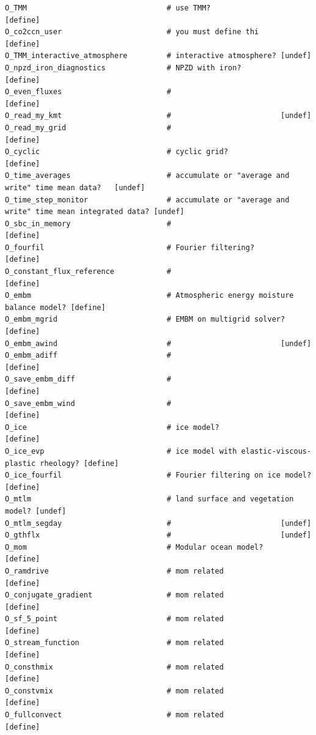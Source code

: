 \documentclass[a4paper]{article}
\begin{document}
\begin{lstlisting}[frame=single,basicstyle=\scriptsize,commentstyle=\color{blue}]
O_TMM                                # use TMM?                [define]
O_co2ccn_user                        # you must define thi     [define]
O_TMM_interactive_atmosphere         # interactive atmosphere? [undef]
O_npzd_iron_diagnostics              # NPZD with iron?         [define]
O_even_fluxes                        #                         [define]
O_read_my_kmt                        #                         [undef]
O_read_my_grid                       #                         [define]
O_cyclic                             # cyclic grid?            [define]
O_time_averages                      # accumulate or "average and write" time mean data?   [undef]
O_time_step_monitor                  # accumulate or "average and write" time mean integrated data? [undef]
O_sbc_in_memory                      #                         [define]
O_fourfil                            # Fourier filtering?      [define]
O_constant_flux_reference            #                         [define]
O_embm                               # Atmospheric energy moisture balance model? [define]
O_embm_mgrid                         # EMBM on multigrid solver? [define]
O_embm_awind                         #                         [undef]
O_embm_adiff                         #                         [define]
O_save_embm_diff                     #                         [define]
O_save_embm_wind                     #                         [define]
O_ice                                # ice model?              [define]
O_ice_evp                            # ice model with elastic-viscous-plastic rheology? [define]
O_ice_fourfil                        # Fourier filtering on ice model? [define]
O_mtlm                               # land surface and vegetation model? [undef]
O_mtlm_segday                        #                         [undef]
O_gthflx                             #                         [undef]
O_mom                                # Modular ocean model?    [define] 
O_ramdrive                           # mom related             [define]
O_conjugate_gradient                 # mom related             [define]
O_sf_5_point                         # mom related             [define]
O_stream_function                    # mom related             [define]
O_consthmix                          # mom related             [define]
O_constvmix                          # mom related             [define]
O_fullconvect                        # mom related             [define]

\end{lstlisting}
\end{document}
